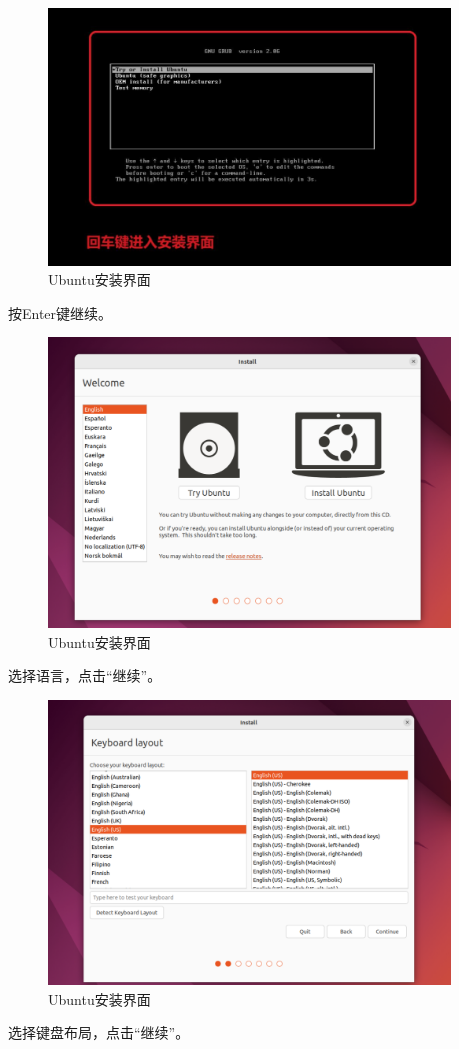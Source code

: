 \documentclass[UTF8]{ctexart}
\begin{document}
\begin{figure}[H]
    \centering
    \includegraphics[width=0.95\textwidth]{picture/Screenshot 2024-10-14 173720.png}
    \caption{Ubuntu安装界面}
\end{figure}
按Enter键继续。

\begin{figure}[H]
    \centering
    \includegraphics[width=0.95\textwidth]{picture/Screenshot 2024-10-14 174058.png}
    \caption{Ubuntu安装界面}
\end{figure}
选择语言，点击“继续”。

\begin{figure}[H]
    \centering
    \includegraphics[width=0.95\textwidth]{picture/Screenshot 2024-10-14 174312.png}
    \caption{Ubuntu安装界面}
\end{figure}
选择键盘布局，点击“继续”。
\end{document}
